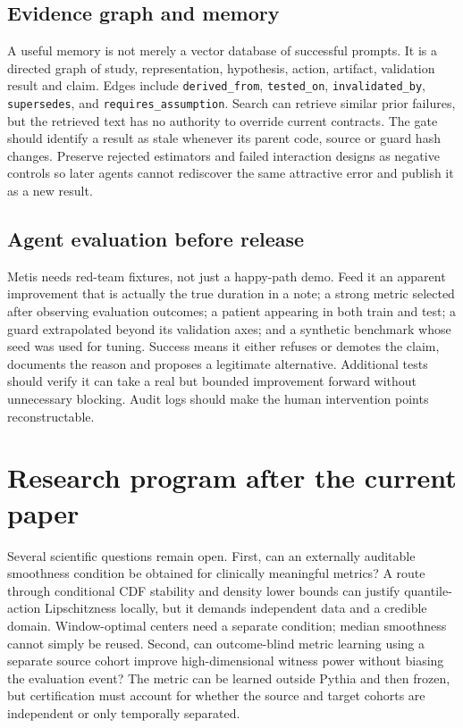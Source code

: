 \documentclass[11pt]{article}
\begin{document}
\subsection{Evidence graph and memory}
A useful memory is not merely a vector database of successful prompts. It is a directed graph of study, representation, hypothesis, action, artifact, validation result and claim. Edges include \texttt{derived\_from}, \texttt{tested\_on}, \texttt{invalidated\_by}, \texttt{supersedes}, and \texttt{requires\_assumption}. Search can retrieve similar prior failures, but the retrieved text has no authority to override current contracts. The gate should identify a result as stale whenever its parent code, source or guard hash changes. Preserve rejected estimators and failed interaction designs as negative controls so later agents cannot rediscover the same attractive error and publish it as a new result.

\subsection{Agent evaluation before release}
Metis needs red-team fixtures, not just a happy-path demo. Feed it an apparent improvement that is actually the true duration in a note; a strong metric selected after observing evaluation outcomes; a patient appearing in both train and test; a guard extrapolated beyond its validation axes; and a synthetic benchmark whose seed was used for tuning. Success means it either refuses or demotes the claim, documents the reason and proposes a legitimate alternative. Additional tests should verify it can take a real but bounded improvement forward without unnecessary blocking. Audit logs should make the human intervention points reconstructable.

\section{Research program after the current paper}
Several scientific questions remain open. First, can an externally auditable smoothness condition be obtained for clinically meaningful metrics? A route through conditional CDF stability and density lower bounds can justify quantile-action Lipschitzness locally, but it demands independent data and a credible domain. Window-optimal centers need a separate condition; median smoothness cannot simply be reused. Second, can outcome-blind metric learning using a separate source cohort improve high-dimensional witness power without biasing the evaluation event? The metric can be learned outside Pythia and then frozen, but certification must account for whether the source and target cohorts are independent or only temporally separated.
\end{document}
